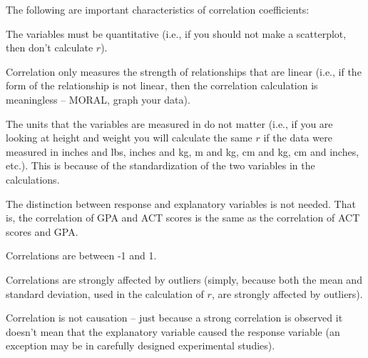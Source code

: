 \documentclass[10pt,openany]{book}\usepackage[]{graphicx}\usepackage[]{color}
\begin{document}
\begin{minipage}{\textwidth}
The following are important characteristics of correlation coefficients:
\begin{Itemize}
  \item The variables must be quantitative (i.e., if you should not make a scatterplot, then don't calculate $r$).
  \item Correlation only measures the strength of relationships that are linear (i.e., if the form of the relationship is not linear, then the correlation calculation is meaningless -- MORAL, graph your data).
  \item The units that the variables are measured in do not matter (i.e., if you are looking at height and weight you will calculate the same $r$ if the data were measured in inches and lbs, inches and kg, m and kg, cm and kg, cm and inches, etc.).  This is because of the standardization of the two variables in the calculations.
  \item The distinction between response and explanatory variables is not needed.  That is, the correlation of GPA and ACT scores is the same as the correlation of ACT scores and GPA.
  \item Correlations are between -1 and 1.
  \item Correlations are strongly affected by outliers (simply, because both the mean and standard deviation, used in the calculation of $r$, are strongly affected by outliers).
  \item Correlation is not causation -- just because a strong correlation is observed it doesn't mean that the explanatory variable caused the response variable (an exception may be in carefully designed experimental studies).
\end{Itemize}
\end{minipage}

\end{document}
